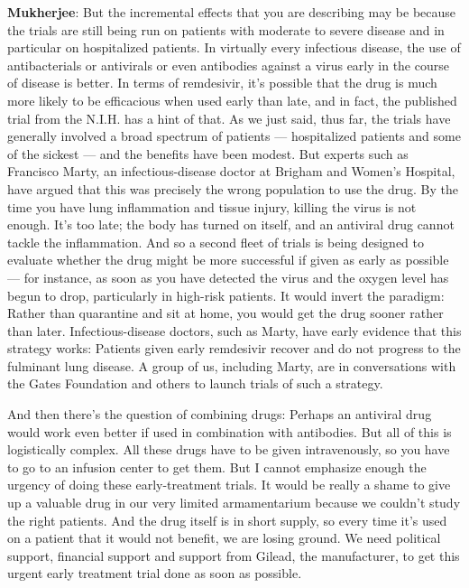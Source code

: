 \textbf{Mukherjee}: But the incremental effects that you are describing
may be because the trials are still being run on patients with moderate
to severe disease and in particular on hospitalized patients. In
virtually every infectious disease, the use of antibacterials or
antivirals or even antibodies against a virus early in the course of
disease is better. In terms of remdesivir, it's possible that the drug
is much more likely to be efficacious when used early than late, and in
fact, the published trial from the N.I.H. has a hint of that. As we just
said, thus far, the trials have generally involved a broad spectrum of
patients --- hospitalized patients and some of the sickest --- and the
benefits have been modest. But experts such as Francisco Marty, an
infectious-disease doctor at Brigham and Women's Hospital, have argued
that this was precisely the wrong population to use the drug. By the
time you have lung inflammation and tissue injury, killing the virus is
not enough. It's too late; the body has turned on itself, and an
antiviral drug cannot tackle the inflammation. And so a second fleet of
trials is being designed to evaluate whether the drug might be more
successful if given as early as possible --- for instance, as soon as
you have detected the virus and the oxygen level has begun to drop,
particularly in high-risk patients. It would invert the paradigm: Rather
than quarantine and sit at home, you would get the drug sooner rather
than later. Infectious-disease doctors, such as Marty, have early
evidence that this strategy works: Patients given early remdesivir
recover and do not progress to the fulminant lung disease. A group of
us, including Marty, are in conversations with the Gates Foundation and
others to launch trials of such a strategy.

And then there's the question of combining drugs: Perhaps an antiviral
drug would work even better if used in combination with antibodies. But
all of this is logistically complex. All these drugs have to be given
intravenously, so you have to go to an infusion center to get them. But
I cannot emphasize enough the urgency of doing these early-treatment
trials. It would be really a shame to give up a valuable drug in our
very limited armamentarium because we couldn't study the right patients.
And the drug itself is in short supply, so every time it's used on a
patient that it would not benefit, we are losing ground. We need
political support, financial support and support from Gilead, the
manufacturer, to get this urgent early treatment trial done as soon as
possible.

